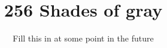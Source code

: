 \documentclass{report}
\begin{document}
\title{256 Shades of gray}
\author{Fill this in at some point in the future}

\maketitle

\begin{abstract}

\end{abstract}

\newpage
\tableofcontents
\newpage







\end{document}
